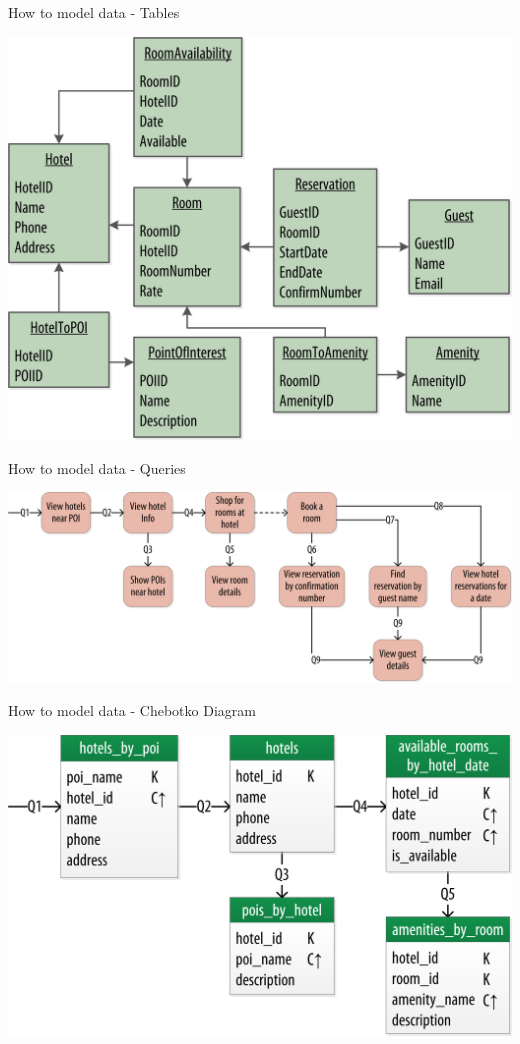 \documentclass[
  10pt
]{beamer}
\begin{document}
\begin{frame}{How to model data - Tables \cite{cassandra_oreilly}}
  \begin{center}
    \includegraphics[width=0.75\columnwidth]{resources/model_example_rdbms_step1.png}
  \end{center}
\end{frame}

\begin{frame}{How to model data - Queries \cite{cassandra_oreilly}}
  \begin{center}
    \includegraphics[width=0.75\columnwidth]{resources/model_example_queries_step2.png}
  \end{center}
\end{frame}

\begin{frame}{How to model data - Chebotko Diagram \cite{cassandra_oreilly}}
  \begin{center}
    \includegraphics[width=0.75\columnwidth]{resources/model_example_chebotko_step3.png}
  \end{center}
\end{frame}
\end{document}

